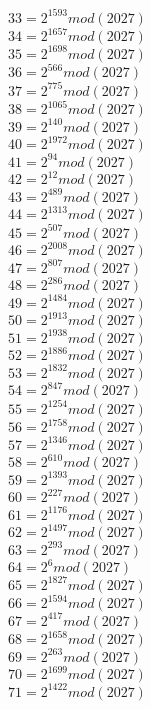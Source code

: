 \documentclass[12pt, letterpaper]{article}
\begin{document}
\begin{itemize}
\begin{multicols}{3}
$33= 2^{1593} mod (2027)$\\
$34= 2^{1657} mod (2027)$\\
$35= 2^{1698} mod (2027)$\\
$36= 2^{566} mod (2027)$\\
$37= 2^{775} mod (2027)$\\
$38= 2^{1065} mod (2027)$\\
$39= 2^{140} mod (2027)$\\
$40= 2^{1972} mod (2027)$\\
$41= 2^{94} mod (2027)$\\
$42= 2^{12} mod (2027)$\\
$43= 2^{489} mod (2027)$\\
$44= 2^{1313} mod (2027)$\\
$45= 2^{507} mod (2027)$\\
$46= 2^{2008} mod (2027)$\\
$47= 2^{807} mod (2027)$\\
$48= 2^{286} mod (2027)$\\
$49= 2^{1484} mod (2027)$\\
$50= 2^{1913} mod (2027)$\\
$51= 2^{1938} mod (2027)$\\
$52= 2^{1886} mod (2027)$\\
$53= 2^{1832} mod (2027)$\\
$54= 2^{847} mod (2027)$\\
$55= 2^{1254} mod (2027)$\\
$56= 2^{1758} mod (2027)$\\
$57= 2^{1346} mod (2027)$\\
$58= 2^{610} mod (2027)$\\
$59= 2^{1393} mod (2027)$\\
$60= 2^{227} mod (2027)$\\
$61= 2^{1176} mod (2027)$\\
$62= 2^{1497} mod (2027)$\\
$63= 2^{293} mod (2027)$\\
$64= 2^{6} mod (2027)$\\
$65= 2^{1827} mod (2027)$\\
$66= 2^{1594} mod (2027)$\\
$67= 2^{417} mod (2027)$\\
$68= 2^{1658} mod (2027)$\\
$69= 2^{263} mod (2027)$\\
$70= 2^{1699} mod (2027)$\\
$71= 2^{1422} mod (2027)$\\

\end{multicols}
\end{itemize}
\end{document}
